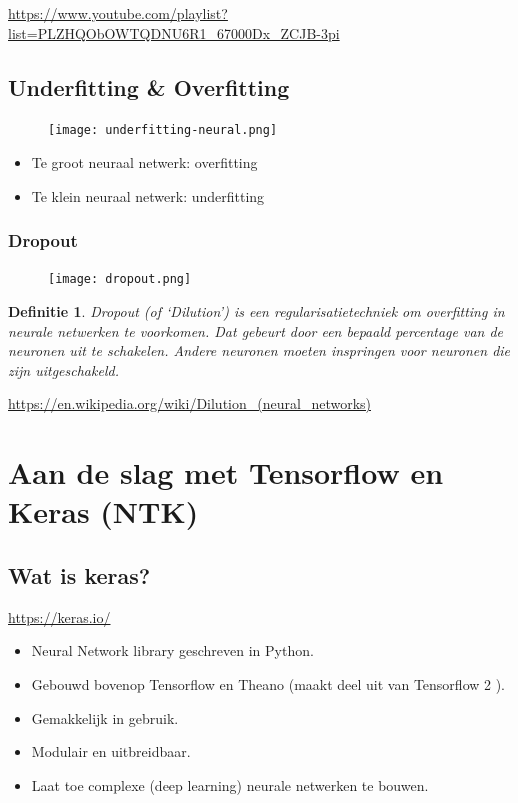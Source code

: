 \documentclass{article}
\newtheorem{theorem}{Definitie}[section]
\begin{document}
\url{https://www.youtube.com/playlist?list=PLZHQObOWTQDNU6R1_67000Dx_ZCJB-3pi}

\subsection{Underfitting \& Overfitting}

\begin{figure}[H]
    \centering
    \texttt{[image: underfitting-neural.png]}
\end{figure}

\begin{itemize}
    \item Te groot neuraal netwerk: overfitting
    \item Te klein neuraal netwerk: underfitting
\end{itemize}


\subsubsection{Dropout}

\begin{figure}[H]
    \centering
    \texttt{[image: dropout.png]}
\end{figure}

\begin{theorem}
    Dropout (of `Dilution') is een regularisatietechniek om overfitting in neurale netwerken te voorkomen.
    Dat gebeurt door een bepaald percentage van de neuronen uit te schakelen. Andere neuronen moeten inspringen
    voor neuronen die zijn uitgeschakeld.
\end{theorem}

\url{https://en.wikipedia.org/wiki/Dilution_(neural_networks)}

\section{Aan de slag met Tensorflow en Keras (NTK)}

\subsection{Wat is keras?}

\url{https://keras.io/}

\begin{itemize}
    \item Neural Network library geschreven in Python.
    \item Gebouwd bovenop Tensorflow en Theano (maakt deel uit van Tensorflow 2 ).
    \item Gemakkelijk in gebruik.
    \item Modulair en uitbreidbaar.
    \item Laat toe complexe (deep learning) neurale netwerken te bouwen.
\end{itemize}
\end{document}

